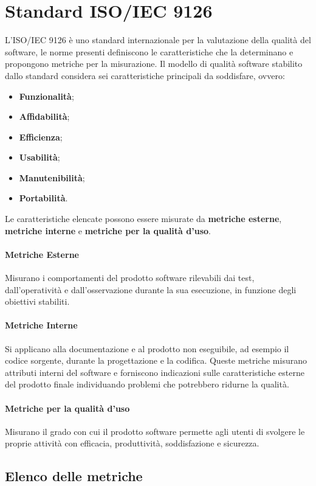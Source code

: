 \newpage
\section{Standard ISO/IEC 9126}\label{9126}
L'ISO/IEC 9126 è uno standard internazionale per la valutazione della qualità del software, le norme presenti definiscono le caratteristiche che la determinano e propongono metriche per la misurazione.
Il modello di qualità software stabilito dallo standard considera sei caratteristiche principali da soddisfare, ovvero:
\begin{itemize}
	\item \textbf{Funzionalità};
	\item \textbf{Affidabilità};
	\item \textbf{Efficienza};
	\item \textbf{Usabilità};
	\item \textbf{Manutenibilità};
	\item \textbf{Portabilità}.
\end{itemize}
Le caratteristiche elencate possono essere misurate da \textbf{metriche esterne}, \textbf{metriche interne} e \textbf{metriche per la qualità d'uso}.
\paragraph*{Metriche Esterne}
Misurano i comportamenti del prodotto software rilevabili dai test, dall'operatività e dall'osservazione durante la sua esecuzione, in funzione degli obiettivi stabiliti.
\paragraph*{Metriche Interne}
Si applicano alla documentazione e al prodotto non eseguibile, ad esempio il codice sorgente, durante la progettazione e la codifica. Queste metriche misurano attributi interni del software e forniscono indicazioni sulle caratteristiche esterne del prodotto finale individuando problemi che potrebbero ridurne la qualità.
\paragraph*{Metriche per la qualità d'uso}
Misurano il grado con cui il prodotto software permette agli utenti di svolgere le proprie attività con efficacia, produttività, soddisfazione e sicurezza.

\subsection{Elenco delle metriche} \label{Metriche}
